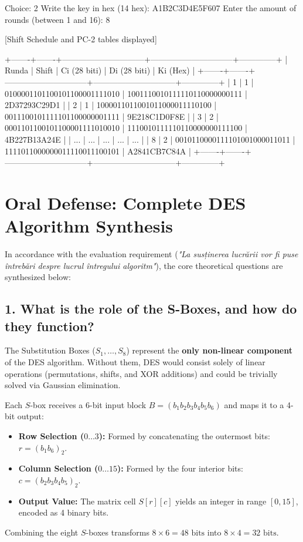 \documentclass[12pt,a4paper]{article}
\begin{document}
\begin{terminalwindow}
Choice: 2
Write the key in hex (14 hex): A1B2C3D4E5F607
Enter the amount of rounds (between 1 and 16): 8

[Shift Schedule and PC-2 tables displayed]

+-------+-------+------------------------------+------------------------------+--------------+
| Runda | Shift | Ci (28 biti)                 | Di (28 biti)                 | Ki (Hex)     |
+-------+-------+------------------------------+------------------------------+--------------+
| 1     | 1     | 0100001101100101100001111010 | 1001110010111110110000000111 | 2D37293C29D1 |
| 2     | 1     | 1000011011001011000011110100 | 0011100101111101100000001111 | 9E218C1D0F8E |
| 3     | 2     | 0001101100101100001111010010 | 1110010111110110000000111100 | 4B227B13A24E |
| ...   | ...   | ...                          | ...                          | ...          |
| 8     | 2     | 0010110000111101001000011011 | 1111011000000011110011100101 | A2841CB7C84A |
+-------+-------+------------------------------+------------------------------+--------------+
\end{terminalwindow}

\section{Oral Defense: Complete DES Algorithm Synthesis}

In accordance with the evaluation requirement (\textit{"La susținerea lucrării vor fi puse întrebări despre lucrul întregului algoritm"}), the core theoretical questions are synthesized below:

\subsection{1. What is the role of the S-Boxes, and how do they function?}
The Substitution Boxes ($S_1, \dots, S_8$) represent the \textbf{only non-linear component} of the DES algorithm. Without them, DES would consist solely of linear operations (permutations, shifts, and XOR additions) and could be trivially solved via Gaussian elimination.

Each $S$-box receives a 6-bit input block $B = (b_1 b_2 b_3 b_4 b_5 b_6)$ and maps it to a 4-bit output:
\begin{itemize}
    \item \textbf{Row Selection ($0 \dots 3$):} Formed by concatenating the outermost bits: $r = (b_1 b_6)_2$.
    \item \textbf{Column Selection ($0 \dots 15$):} Formed by the four interior bits: $c = (b_2 b_3 b_4 b_5)_2$.
    \item \textbf{Output Value:} The matrix cell $S[r][c]$ yields an integer in range $[0, 15]$, encoded as 4 binary bits.
\end{itemize}
Combining the eight $S$-boxes transforms $8 \times 6 = 48\text{ bits}$ into $8 \times 4 = 32\text{ bits}$.
\end{document}
